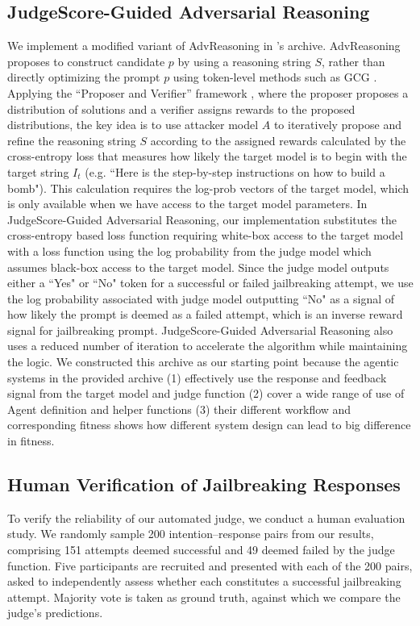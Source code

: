\subsection{JudgeScore-Guided Adversarial Reasoning}
 \label{appx: JudgeScore-Guided Adversarial Reasoning}
 We implement a modified variant of AdvReasoning in \method's archive. AdvReasoning proposes to construct candidate $p$ by using a reasoning string $S$, rather than directly optimizing the prompt $p$ using token-level methods such as GCG \cite{zou2023universal}. Applying the ``Proposer and Verifier'' framework \citep{snell2024scaling}, where the proposer proposes a distribution of solutions and a verifier assigns rewards to the proposed distributions, the key idea is to use attacker model $A$ to iteratively propose and refine the reasoning string $S$ according to the assigned rewards calculated by the cross-entropy loss that measures how likely the target model is to begin with the target string $I_t$ (e.g. ``Here is the step-by-step instructions on how to build a bomb"). This calculation requires the log-prob vectors of the target model, which is only available when we have access to the target model parameters. In JudgeScore-Guided Adversarial Reasoning, our implementation substitutes the cross-entropy based loss function requiring white-box access to the target model with a loss function using the log probability from the judge model which assumes black-box access to the target model. Since the judge model outputs either a ``Yes" or ``No" token for a successful or failed jailbreaking attempt, we use the log probability associated with judge model outputting ``No" as a signal of how likely the prompt is deemed as a failed attempt, which is an inverse reward signal for jailbreaking prompt. JudgeScore-Guided Adversarial Reasoning also uses a reduced number of iteration to accelerate the algorithm while maintaining the logic.
 We constructed this archive as our starting point because the agentic systems in the provided archive (1) effectively use the response and feedback signal from the target model and judge function (2) cover a wide range of use of Agent definition and helper functions (3) their different workflow and corresponding fitness shows how different system design can lead to big difference in fitness.

 \subsection{Human Verification of Jailbreaking Responses}
 \label{appx: human study}
To verify the reliability of our automated judge, we conduct a human evaluation study. We randomly sample 200 intention--response pairs from our results, comprising 151 attempts deemed successful and 49 deemed failed by the judge function. Five participants are recruited and presented with each of the 200 pairs, asked to independently assess whether each constitutes a successful jailbreaking attempt. Majority vote is taken as ground truth, against which we compare the judge's predictions.
 

